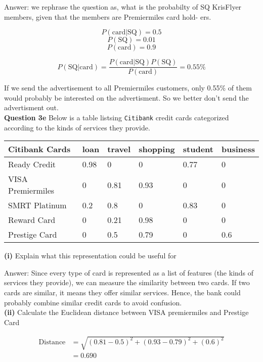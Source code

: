 \documentclass[11pt,a4paper]{report}
\begin{document}
\begin{multicols*}{2}
\noindent Answer: we rephrase the question as, what is the probabilty of SQ KrisFlyer members, given that the members are Premiermiles card hold- ers.

$$P(\text{card} | \text{SQ}) = 0.5$$
$$P(\text{SQ}) = 0.01$$
$$P(\text{card}) = 0.9$$

$$P(\text{SQ} | \text{card}) = \frac{P(\text{card} | \text{SQ}) P(\text{SQ})}{P(\text{card})} = 0.55\%$$

\noindent If we send the advertisement to all Premiermiles customers, only 0.55\% of them would probably be interested on the advertisment. So we better don't send the advertisment out. \\

\noindent \textbf{Question 3e} Below is a table listsing \verb|Citibank| credit cards categorized according to the kinds of services they provide.

\tiny
\begin{center}
\begin{tabular}{|l | l | l | l | l | l |}
    \hline
    Citibank Cards & loan & travel & shopping & student & business \\
    \hline
    Ready Credit   & 0.98 & 0      & 0        & 0.77    & 0 \\
    VISA Premiermiles & 0 & 0.81   & 0.93     & 0       & 0 \\
    SMRT Platinum  & 0.2  & 0.8    & 0        & 0.83    & 0 \\
    Reward Card    & 0    & 0.21   & 0.98     & 0       & 0 \\
    Prestige Card  & 0    & 0.5    & 0.79     & 0       & 0.6\\
    \hline
\end{tabular}
\end{center}
\normalsize

\noindent \textbf{(i)} Explain what this representation could be useful for

\noindent Answer: Since every type of card is represented as a list of features (the kinds of services they provide), we can measure the similarity between two cards. If two cards are similar, it means they offer similar services. Hence, the bank could probably combine similar credit cards to avoid confusion. \\

\noindent \textbf{(ii)} Calculate the Euclidean distance between VISA premiermiles and Prestige Card

\begin{equation*}
\begin{split}
    \text{Distance} &= \sqrt{(0.81 - 0.5)^2 + (0.93 - 0.79)^2 + (0.6)^2}\\
    &= 0.690
\end{split}
\end{equation*}


\end{multicols*}
\end{document}
